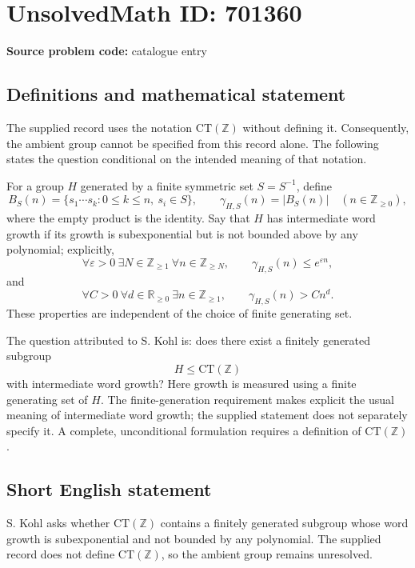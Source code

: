 \documentclass[11pt]{article}
\newcommand{\Z}{\mathbb{Z}}
\newcommand{\R}{\mathbb{R}}
\begin{document}
\section*{UnsolvedMath ID: 701360}
\textbf{Source problem code:} catalogue entry
\subsection{Definitions and mathematical statement}
The supplied record uses the notation \(\mathrm{CT}(\Z)\) without defining it. Consequently, the ambient group cannot be specified from this record alone. The following states the question conditional on the intended meaning of that notation.

For a group \(H\) generated by a finite symmetric set \(S=S^{-1}\), define
\[
B_S(n)=\{s_1\cdots s_k:0\leq k\leq n,\ s_i\in S\},\qquad \gamma_{H,S}(n)=|B_S(n)|
\quad(n\in\Z_{\geq0}),
\]
where the empty product is the identity. Say that \(H\) has intermediate word growth if its growth is subexponential but is not bounded above by any polynomial; explicitly,
\[
\forall\varepsilon>0\ \exists N\in\Z_{\geq1}\ \forall n\in\Z_{\geq N},\qquad
\gamma_{H,S}(n)\leq e^{\varepsilon n},
\]
and
\[
\forall C>0\ \forall d\in\R_{\geq0}\ \exists n\in\Z_{\geq1},\qquad
\gamma_{H,S}(n)>Cn^d.
\]
These properties are independent of the choice of finite generating set.

The question attributed to S. Kohl is: does there exist a finitely generated subgroup
\[
H\leq\mathrm{CT}(\Z)
\]
with intermediate word growth? Here growth is measured using a finite generating set of \(H\). The finite-generation requirement makes explicit the usual meaning of intermediate word growth; the supplied statement does not separately specify it. A complete, unconditional formulation requires a definition of \(\mathrm{CT}(\Z)\).
\subsection{Short English statement}
S. Kohl asks whether \(\mathrm{CT}(\Z)\) contains a finitely generated subgroup whose word growth is subexponential and not bounded by any polynomial. The supplied record does not define \(\mathrm{CT}(\Z)\), so the ambient group remains unresolved.
\end{document}
